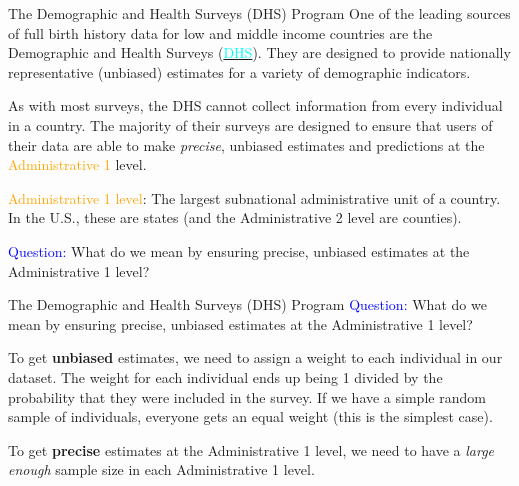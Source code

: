 \documentclass[10pt,t]{beamer}
\begin{document}
\begin{frame}{The Demographic and Health Surveys (DHS) Program}
One of the leading sources of full birth history data for low and middle income countries are the Demographic and Health Surveys (\href{https://dhsprogram.com/}{\textcolor{cyan}{DHS}}). They are designed to provide nationally representative (unbiased) estimates for a variety of demographic indicators. 

\vspace{0.3cm}

As with most surveys, the DHS cannot collect information from every individual in a country. The majority of their surveys are designed to ensure that users of their data are able to make \textit{precise}, unbiased estimates and predictions at the \textcolor{orange}{Administrative 1} level.

\vspace{0.3cm}

\textcolor{orange}{Administrative 1 level}: The largest subnational administrative unit of a country. In the U.S., these are states (and the Administrative 2 level are counties).

\vspace{0.3cm}

\textcolor{blue}{Question:} What do we mean by ensuring precise, unbiased estimates at the Administrative 1 level?

\end{frame}

\begin{frame}{The Demographic and Health Surveys (DHS) Program}
\textcolor{blue}{Question:} What do we mean by ensuring precise, unbiased estimates at the Administrative 1 level?

\vspace{0.3cm}

To get \textbf{unbiased} estimates, we need to assign a weight to each individual in our dataset. The weight for each individual ends up being 1 divided by the probability that they were included in the survey. If we have a simple random sample of individuals, everyone gets an equal weight (this is the simplest case).

\vspace{0.3cm}

To get \textbf{precise} estimates at the Administrative 1 level, we need to have a \textit{large enough} sample size in each Administrative 1 level.

\end{frame}
\end{document}
